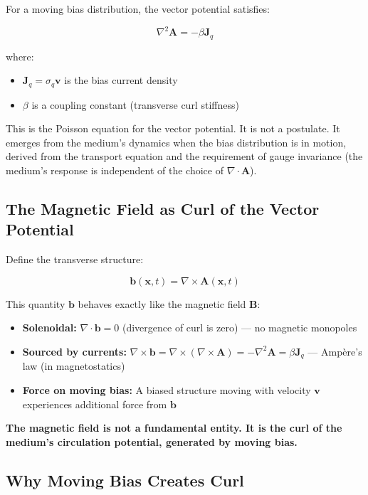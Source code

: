 \documentclass[12pt, a4paper]{article}
\begin{document}
For a moving bias distribution, the vector potential satisfies:

\[
\nabla^2 \mathbf{A} = -\beta \mathbf{J}_q
\]

where:
\begin{itemize}
    \item \( \mathbf{J}_q = \sigma_q \mathbf{v} \) is the bias current density
    \item \( \beta \) is a coupling constant (transverse curl stiffness)
\end{itemize}

This is the Poisson equation for the vector potential. It is not a postulate. It emerges from the medium's dynamics when the bias distribution is in motion, derived from the transport equation and the requirement of gauge invariance (the medium's response is independent of the choice of \( \nabla \cdot \mathbf{A} \)).

\subsection{The Magnetic Field as Curl of the Vector Potential}
\label{subsec:magnetic_field_curl}

Define the transverse structure:

\[
\mathbf{b}(\mathbf{x}, t) = \nabla \times \mathbf{A}(\mathbf{x}, t)
\]

This quantity \( \mathbf{b} \) behaves exactly like the magnetic field \( \mathbf{B} \):

\begin{itemize}
    \item \textbf{Solenoidal:} \( \nabla \cdot \mathbf{b} = 0 \) (divergence of curl is zero) — no magnetic monopoles
    \item \textbf{Sourced by currents:} \( \nabla \times \mathbf{b} = \nabla \times (\nabla \times \mathbf{A}) = -\nabla^2 \mathbf{A} = \beta \mathbf{J}_q \) — Ampère's law (in magnetostatics)
    \item \textbf{Force on moving bias:} A biased structure moving with velocity \( \mathbf{v} \) experiences additional force from \( \mathbf{b} \)
\end{itemize}

\textbf{The magnetic field is not a fundamental entity. It is the curl of the medium's circulation potential, generated by moving bias.}

\subsection{Why Moving Bias Creates Curl}
\label{subsec:why_curl}
\end{document}
